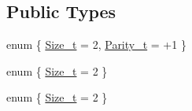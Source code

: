 \subsection*{Public Types}
\begin{DoxyCompactItemize}
\item 
enum \{ \mbox{\hyperlink{structHadron_1_1G2gRep_adbb02275ba8f6791b9c6ceaecb1f6966a6172534c9e0b8f05437d5abea828fe08}{Size\+\_\+t}} = 2, 
\mbox{\hyperlink{structHadron_1_1G2gRep_a4f8e2a0dafa25d75042ca6e7f59b1454a3787e6727c5edab5de5988c4e146c150}{Parity\+\_\+t}} = +1
 \}
\item 
enum \{ \mbox{\hyperlink{structHadron_1_1G2gRep_adbb02275ba8f6791b9c6ceaecb1f6966a6172534c9e0b8f05437d5abea828fe08}{Size\+\_\+t}} = 2
 \}
\item 
enum \{ \mbox{\hyperlink{structHadron_1_1G2gRep_adbb02275ba8f6791b9c6ceaecb1f6966a6172534c9e0b8f05437d5abea828fe08}{Size\+\_\+t}} = 2
 \}
\end{DoxyCompactItemize}
